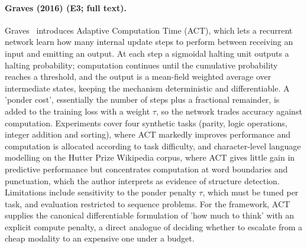 \documentclass[10pt,a4paper]{article}
\begin{document}
\paragraph{Graves (2016) (E3; full text).} Graves~\cite{Graves2016} introduces Adaptive Computation Time (ACT), which lets a recurrent network learn how many internal update steps to perform between receiving an input and emitting an output. At each step a sigmoidal halting unit outputs a halting probability; computation continues until the cumulative probability reaches a threshold, and the output is a mean-field weighted average over intermediate states, keeping the mechanism deterministic and differentiable. A 'ponder cost', essentially the number of steps plus a fractional remainder, is added to the training loss with a weight $\tau$, so the network trades accuracy against computation. Experiments cover four synthetic tasks (parity, logic operations, integer addition and sorting), where ACT markedly improves performance and computation is allocated according to task difficulty, and character-level language modelling on the Hutter Prize Wikipedia corpus, where ACT gives little gain in predictive performance but concentrates computation at word boundaries and punctuation, which the author interprets as evidence of structure detection. Limitations include sensitivity to the ponder penalty $\tau$, which must be tuned per task, and evaluation restricted to sequence problems. For the framework, ACT supplies the canonical differentiable formulation of 'how much to think' with an explicit compute penalty, a direct analogue of deciding whether to escalate from a cheap modality to an expensive one under a budget.
\end{document}
